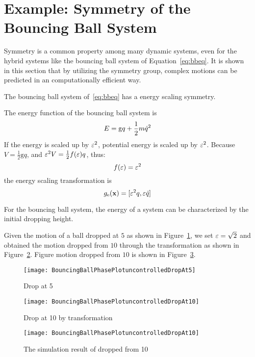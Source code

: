 \section{Example: Symmetry of the Bouncing Ball System}
\label{sec:symball}
Symmetry is a common property among many dynamic systems, even for the hybrid systems like the bouncing ball system of Equation~\ref{eq:bbeq}.
It is shown in this section that by utilizing the symmetry group, complex motions can be predicted in an computationally efficient way.

The bouncing ball system of~\ref{eq:bbeq} has a energy scaling symmetry.

The energy function of the bouncing ball system is  
\[
E=\mathrm{g}q+\frac{1}{2}m\dot{q}^2
\]
If the energy is scaled up by $\varepsilon^2$,  potential energy is scaled up by $\varepsilon^2$.
 Because $V= \frac{1}{2}\mathrm{g}q$, and $\varepsilon^2 V=\frac{1}{2}f(\varepsilon)q$, thus:
\[
f(\varepsilon)=\varepsilon^2
\]
the energy scaling transformation is
\[
g_{\mathrm{e}}(\mathbf{x})=[\varepsilon^2 q, \varepsilon \dot{q}]
\]

For the bouncing ball system, the energy of a system can be characterized by the initial dropping height.

Given the motion of a ball dropped at $5$ as shown in Figure~\ref{fig:bouncing5}, we set $\varepsilon=\sqrt{2}$ and obtained the motion dropped from $10$ through the transformation as shown in Figure~\ref{fig:bouncing10}.
Figure  motion dropped from $10$ is shown in Figure~\ref{fig:bouncing10sim}.
\begin{figure}[!htbp]
  \begin{center}
      \texttt{[image: BouncingBallPhasePlotuncontrolledDropAt5]}
    \caption{Drop at 5}
    \label{fig:bouncing5}
\end{center}
\end{figure}


\begin{figure}[!htbp]
  \begin{center}
      \texttt{[image: BouncingBallPhasePlotuncontrolledDropAt10]}
    \caption{Drop at 10 by transformation}
    \label{fig:bouncing10}
\end{center}
\end{figure}

\begin{figure}[!htbp]
  \begin{center}
      \texttt{[image: BouncingBallPhasePlotuncontrolledDropAt10]}
    \caption{The simulation result of dropped from 10}
    \label{fig:bouncing10sim}
\end{center}
\end{figure}



